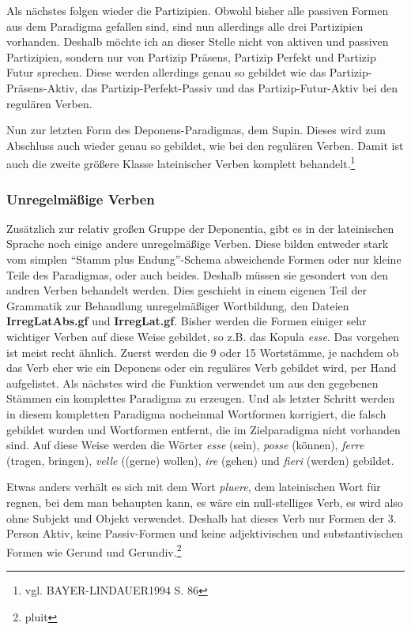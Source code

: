 \documentclass[12pt,abstract=on,titlepage,bibliography=totoc,ngerman,listof=totoc]{scrreprt}
\begin{document}
Als nächstes folgen wieder die Partizipien. Obwohl bisher alle passiven Formen aus dem Paradigma gefallen sind, sind nun allerdings alle drei Partizipien vorhanden. Deshalb möchte ich an dieser Stelle nicht von aktiven und passiven Partizipien, sondern nur von Partizip Präsens, Partizip Perfekt und Partizip Futur sprechen. Diese werden allerdings genau so gebildet wie das Partizip-Präsens-Aktiv, das Partizip-Perfekt-Passiv und das Partizip-Futur-Aktiv bei den regulären Verben. \par
Nun zur letzten Form des Deponens-Paradigmas, dem Supin. Dieses wird zum Abschluss auch wieder genau so gebildet, wie bei den regulären Verben. Damit ist auch die zweite größere Klasse lateinischer Verben komplett behandelt.\footnote{vgl. BAYER-LINDAUER1994 S. 86} \par
\subsubsection{Unregelmäßige Verben}
Zusätzlich zur relativ großen Gruppe der Deponentia, gibt es in der lateinischen Sprache noch einige andere unregelmäßige Verben. Diese bilden entweder stark vom simplen ``Stamm plus Endung''-Schema abweichende Formen oder nur kleine Teile des Paradigmas, oder auch beides. Deshalb müssen sie gesondert von den andren Verben behandelt werden. Dies geschieht in einem eigenen Teil der Grammatik zur Behandlung unregelmäßiger Wortbildung, den Dateien \textbf{IrregLatAbs.gf} und \textbf{IrregLat.gf}. Bisher werden die Formen einiger sehr wichtiger Verben auf diese Weise gebildet, so z.B. das Kopula \textit{esse}. Das vorgehen ist meist recht ähnlich. Zuerst werden die 9 oder 15 Wortstämme, je nachdem ob das Verb eher wie ein Deponens oder ein reguläres Verb gebildet wird, per Hand aufgelistet. Als nächstes wird die Funktion verwendet um aus den gegebenen Stämmen ein komplettes Paradigma zu erzeugen. Und als letzter Schritt werden in diesem kompletten Paradigma nocheinmal Wortformen korrigiert, die falsch gebildet wurden und Wortformen entfernt, die im Zielparadigma nicht vorhanden sind. Auf diese Weise werden die Wörter \textit{esse} (sein), \textit{posse} (können), \textit{ferre} (tragen, bringen), \textit{velle} ((gerne) wollen), \textit{ire} (gehen) und \textit{fieri} (werden) gebildet. \par
Etwas anders verhält es sich mit dem Wort \textit{pluere}, dem lateinischen Wort für regnen, bei dem man behaupten kann, es wäre ein null-stelliges Verb, es wird also ohne Subjekt und Objekt verwendet. Deshalb hat dieses Verb nur Formen der 3. Person Aktiv, keine Passiv-Formen und keine adjektivischen und substantivischen Formen wie Gerund und Gerundiv.\footnote{pluit}
\end{document}
